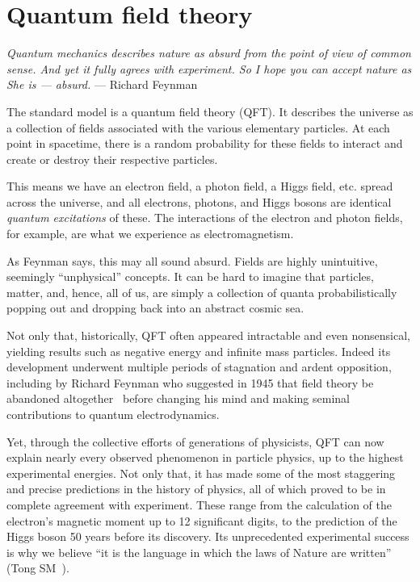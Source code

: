 \chapter{Quantum field theory}
\label{sec:01_qft}

\begin{center}
	\centering
	\noindent
	\textit{Quantum mechanics describes nature as absurd from the point of view of common sense. And yet it fully agrees with experiment. So I hope you can accept nature as She is --- absurd.} --- Richard Feynman
\end{center}

The standard model is a quantum field theory (QFT).
It describes the universe as a collection of fields associated with the various elementary particles.
At each point in spacetime, there is a random probability for these fields to interact and create or destroy their respective particles.

This means we have an electron field, a photon field, a Higgs field, etc. spread across the universe, and all electrons, photons, and Higgs bosons are identical \textit{quantum excitations} of these.
The interactions of the electron and photon fields, for example, are what we experience as electromagnetism.

As Feynman says, this may all sound absurd.
Fields are highly unintuitive, seemingly ``unphysical'' concepts.
It can be hard to imagine that particles, matter, and, hence, all of us, are simply a collection of quanta probabilistically popping out and dropping back into an abstract cosmic sea.

Not only that, historically, QFT often appeared intractable and even nonsensical, yielding results such as negative energy and infinite mass particles.
Indeed its development underwent multiple periods of stagnation and ardent opposition, including by Richard Feynman who suggested in 1945 that field theory be abandoned altogether~\cite{WeinbergHistoryQFT} before changing his mind and making seminal contributions to quantum electrodynamics.

Yet, through the collective efforts of generations of physicists, QFT can now explain nearly every observed phenomenon in particle physics, up to the highest experimental energies.
Not only that, it has made some of the most staggering and precise predictions in the history of physics, all of which proved to be in complete agreement with experiment.
These range from the calculation of the electron's magnetic moment up to 12 significant digits, to the prediction of the Higgs boson 50 years before its discovery.
Its unprecedented experimental success is why we believe ``it is the language in which the laws of Nature are written'' (Tong SM~\cite{TongSM}).


